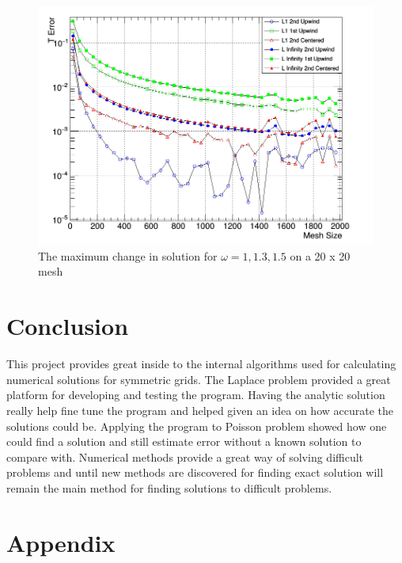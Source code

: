 \documentclass[paper=a4, fontsize=11pt, abstract=on]{scrartcl}
\numberwithin{equation}{section}		%
\numberwithin{figure}{section}			%
\numberwithin{table}{section}				%
\begin{document}
\begin{figure}[H]
\centering
\includegraphics[width=0.8\linewidth]{3a33}
\caption{The maximum change in solution for $\omega = 1, 1.3, 1.5$ on a 20 x 20 mesh}
\label{3a3}
\end{figure}





\section{Conclusion}
This project provides great inside to the internal algorithms used for calculating numerical solutions for symmetric grids. The Laplace problem provided a great platform for developing and testing the program. Having the analytic solution really help fine tune the program and helped given an idea on how accurate the solutions could be. Applying the program to Poisson problem showed how one could find a solution and still estimate error without a known solution to compare with. Numerical methods provide a great way of solving difficult problems and until new methods are discovered for finding exact solution will remain the main method for finding solutions to difficult problems. 






\appendix
\section{Appendix} \label{App:Appendix}
\end{document}
